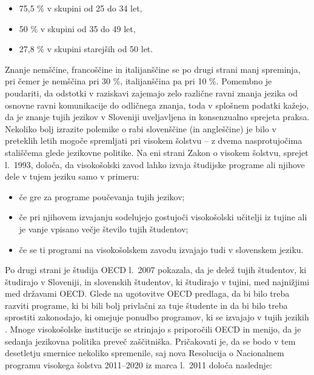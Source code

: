 \begin{multicols}{2}
\begin{itemize}
\item 75,5 \% v skupini od 25 do 34 let, 
\item 50 \% v skupini od 35 do 49 let, 
\item 27,8 \% v skupini starejših od 50 let.
\end{itemize}

Znanje nemščine, francoščine in itali\-janščine se po drugi strani manj spreminja, pri čemer je nemščina pri 30 \%, itali\-janščina pa pri 10 \%. Pomembno je poudariti, da odstotki v raziskavi zajemajo zelo različne ravni znanja jezika od osnovne ravni komunikacije do odličnega znanja, toda v splošnem podatki kažejo, da je znanje tujih jezikov v Sloveniji uveljav\-ljena in konsenzualno sprejeta praksa.  Nekoliko bolj izrazite polemike o rabi slovenščine (in angleščine) je bilo v preteklih letih mogoče sprem\-ljati pri visokem šolstvu – z dvema nasprotujočima stališ\-čema glede jezikovne politike. Na eni strani Zakon o visokem šolstvu, sprejet l.~1993, določa, da visokošolski zavod lahko izvaja študijske programe ali njihove dele v tujem jeziku samo v primeru:

\begin{itemize}
\item če gre za programe poučevanja tujih jezikov;
\item če pri njihovem izvajanju sodelujejo gostujoči visokošolski učitelji iz tujine ali je vanje vpisano večje število tujih študentov;
\item če se ti programi na visokošolskem zavodu izvajajo tudi v slovenskem jeziku.
\end{itemize}


Po drugi strani je študija OECD l.~2007 pokazala, da je delež tujih študentov, ki študirajo v Sloveniji, in slovenskih študentov, ki študirajo v tujini, med naj\-nižjimi med državami OECD. Glede na ugotovitve OECD predlaga, da bi bilo treba razviti programe, ki bi bili bolj privlačni za tuje študente in da bi bilo treba sprostiti zako\-nodajo, ki omejuje ponudbo programov, ki se izvajajo v tujih jezikih \cite{OECD1}. Mnoge visokošolske institucije se strinjajo s priporočili OECD in menijo, da je sedanja jezikovna politika preveč zaščitniška. 
Pričakovati je, da se bodo v tem desetletju smernice nekoliko spremenile, saj nova Resolucija o Nacionalnem programu visokega šolstva 2011–2020 iz marca l.~2011 določa naslednje: 


\end{multicols}
